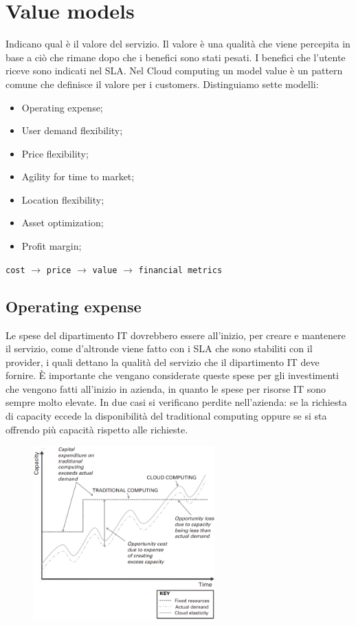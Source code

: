 \section{Value models}
Indicano qual è il valore del servizio. Il valore è una qualità che viene percepita in base a ciò che rimane dopo che i benefici sono stati pesati. I benefici che l'utente riceve sono indicati nel SLA. Nel Cloud computing un model value è un pattern comune che definisce il valore per i customers. Distinguiamo sette modelli:
\begin{itemize}
    \item Operating expense;
    \item User demand flexibility;
    \item Price flexibility;
    \item Agility for time to market;
    \item Location flexibility;
    \item Asset optimization;
    \item Profit margin;
\end{itemize}

\vspace{5mm}
\begin{center}
    \texttt{cost} $\rightarrow$ \texttt{price} $\rightarrow$ \texttt{value} $\rightarrow$ \texttt{financial metrics}
\end{center}

\subsection{Operating expense}
Le spese del dipartimento IT dovrebbero essere all'inizio, per creare e mantenere il servizio, come d'altronde viene fatto con i SLA che sono stabiliti con il provider, i quali dettano la qualità del servizio che il dipartimento IT deve fornire. È importante che vengano considerate queste spese per gli investimenti che vengono fatti all'inizio in azienda, in quanto le spese per risorse IT sono sempre molto elevate. In due casi si verificano perdite nell'azienda: se la richiesta di capacity eccede la disponibilità del traditional computing oppure se si sta offrendo più capacità rispetto alle richieste.

\begin{figure}[htb!]
    \centering
    \includegraphics[width=7cm]{./Images/cap6/6.4.png}
\end{figure}

